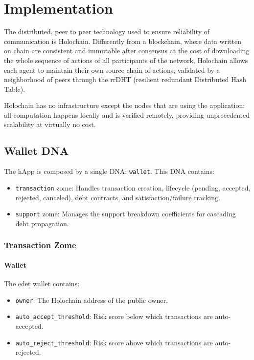 \documentclass[11pt]{article}
\begin{document}
\section{Implementation}
\label{sec:implementation}

The distributed, peer to peer technology used to ensure reliability of communication is Holochain. Differently from a blockchain, where data written on chain are consistent and immutable after consensus at the cost of downloading the whole sequence of actions of all participants of the network, Holochain allows each agent to maintain their own source chain of actions, validated by a neighborhood of peers through the rrDHT (resilient redundant Distributed Hash Table).

Holochain has no infrastructure except the nodes that are using the application: all computation happens locally and is verified remotely, providing unprecedented scalability at virtually no cost.

\subsection{Wallet DNA}

The hApp is composed by a single DNA: \texttt{wallet}. This DNA contains:

\begin{itemize}
    \item \texttt{transaction} zome: Handles transaction creation, lifecycle (pending, accepted, rejected, canceled), debt contracts, and satisfaction/failure tracking.
    \item \texttt{support} zome: Manages the support breakdown coefficients for cascading debt propagation.
\end{itemize}

\subsubsection{Transaction Zome}

\paragraph{Wallet} The edet wallet contains:
\begin{itemize}
    \item \texttt{owner}: The Holochain address of the public owner.
    \item \texttt{auto\_accept\_threshold}: Risk score below which transactions are auto-accepted.
    \item \texttt{auto\_reject\_threshold}: Risk score above which transactions are auto-rejected.
\end{itemize}
\end{document}

